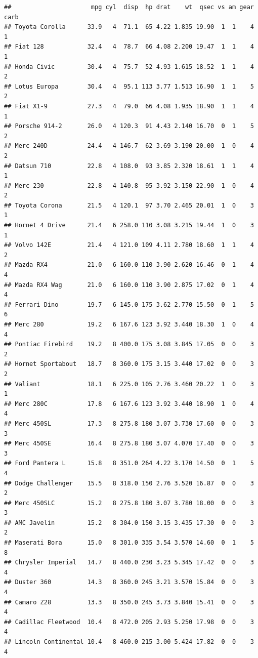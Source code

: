 \documentclass[
  12pt,
  oneside]{book}
\theoremstyle{definition}
\theoremstyle{definition}
\theoremstyle{definition}
\theoremstyle{definition}
\theoremstyle{remark}
\begin{document}
\begin{verbatim}
##                      mpg cyl  disp  hp drat    wt  qsec vs am gear carb
## Toyota Corolla      33.9   4  71.1  65 4.22 1.835 19.90  1  1    4    1
## Fiat 128            32.4   4  78.7  66 4.08 2.200 19.47  1  1    4    1
## Honda Civic         30.4   4  75.7  52 4.93 1.615 18.52  1  1    4    2
## Lotus Europa        30.4   4  95.1 113 3.77 1.513 16.90  1  1    5    2
## Fiat X1-9           27.3   4  79.0  66 4.08 1.935 18.90  1  1    4    1
## Porsche 914-2       26.0   4 120.3  91 4.43 2.140 16.70  0  1    5    2
## Merc 240D           24.4   4 146.7  62 3.69 3.190 20.00  1  0    4    2
## Datsun 710          22.8   4 108.0  93 3.85 2.320 18.61  1  1    4    1
## Merc 230            22.8   4 140.8  95 3.92 3.150 22.90  1  0    4    2
## Toyota Corona       21.5   4 120.1  97 3.70 2.465 20.01  1  0    3    1
## Hornet 4 Drive      21.4   6 258.0 110 3.08 3.215 19.44  1  0    3    1
## Volvo 142E          21.4   4 121.0 109 4.11 2.780 18.60  1  1    4    2
## Mazda RX4           21.0   6 160.0 110 3.90 2.620 16.46  0  1    4    4
## Mazda RX4 Wag       21.0   6 160.0 110 3.90 2.875 17.02  0  1    4    4
## Ferrari Dino        19.7   6 145.0 175 3.62 2.770 15.50  0  1    5    6
## Merc 280            19.2   6 167.6 123 3.92 3.440 18.30  1  0    4    4
## Pontiac Firebird    19.2   8 400.0 175 3.08 3.845 17.05  0  0    3    2
## Hornet Sportabout   18.7   8 360.0 175 3.15 3.440 17.02  0  0    3    2
## Valiant             18.1   6 225.0 105 2.76 3.460 20.22  1  0    3    1
## Merc 280C           17.8   6 167.6 123 3.92 3.440 18.90  1  0    4    4
## Merc 450SL          17.3   8 275.8 180 3.07 3.730 17.60  0  0    3    3
## Merc 450SE          16.4   8 275.8 180 3.07 4.070 17.40  0  0    3    3
## Ford Pantera L      15.8   8 351.0 264 4.22 3.170 14.50  0  1    5    4
## Dodge Challenger    15.5   8 318.0 150 2.76 3.520 16.87  0  0    3    2
## Merc 450SLC         15.2   8 275.8 180 3.07 3.780 18.00  0  0    3    3
## AMC Javelin         15.2   8 304.0 150 3.15 3.435 17.30  0  0    3    2
## Maserati Bora       15.0   8 301.0 335 3.54 3.570 14.60  0  1    5    8
## Chrysler Imperial   14.7   8 440.0 230 3.23 5.345 17.42  0  0    3    4
## Duster 360          14.3   8 360.0 245 3.21 3.570 15.84  0  0    3    4
## Camaro Z28          13.3   8 350.0 245 3.73 3.840 15.41  0  0    3    4
## Cadillac Fleetwood  10.4   8 472.0 205 2.93 5.250 17.98  0  0    3    4
## Lincoln Continental 10.4   8 460.0 215 3.00 5.424 17.82  0  0    3    4
\end{verbatim}
\end{document}

